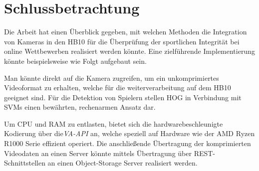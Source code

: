 
\section{Schlussbetrachtung}

Die Arbeit hat einen Überblick gegeben, mit welchen Methoden die Integration von Kameras in den HB10 für die Überprüfung der sportlichen Integrität bei online Wettbewerben realisiert werden könnte. Eine zielführende Implementierung könnte beispielsweise wie Folgt aufgebaut sein.

Man könnte direkt auf die Kamera zugreifen, um ein unkomprimiertes Videoformat zu erhalten, welche für die weiterverarbeitung auf dem HB10 geeignet sind.
Für die Detektion von Spielern stellen HOG in Verbindung mit SVMs einen bewährten, rechenarmen Ansatz dar. 

Um CPU und RAM zu entlasten, bietet sich die hardwarebeschleunigte Kodierung über die\textit{VA-API} an, welche speziell auf Hardware wie der 
AMD Ryzen R1000 Serie effizient operiert.
Die anschließende Übertragung der komprimierten Videodaten an einen Server könnte mittels Übertragung über REST-Schnittstellen an einen Object-Storage Server realisiert werden.

\vspace{1em}